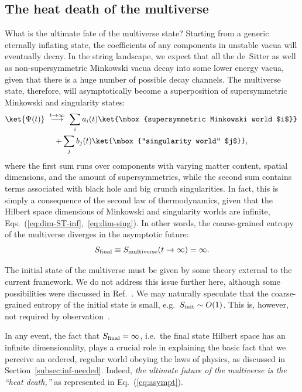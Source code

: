 \documentclass[12pt]{article}
\begin{document}
\subsection{The heat death of the multiverse}
\label{subsec:infinite}

What is the ultimate fate of the multiverse state?  Starting from a generic 
eternally inflating state, the coefficients of any components in unstable 
vacua will eventually decay.  In the string landscape, we expect that all 
the de~Sitter as well as non-supersymmetric Minkowski vacua decay into 
some lower energy vacua, given that there is a huge number of possible 
decay channels.  The multiverse state, therefore, will asymptotically 
become a superposition of supersymmetric Minkowski and singularity states:
%
\begin{multline}
  \ket{\Psi(t)} \,\,\stackrel{t \rightarrow \infty}{\longrightarrow}\,\, 
    \sum_i a_i(t) \ket{\mbox{supersymmetric Minkowski world $i$}}
  \,\\ + \sum_j b_j(t) \ket{\mbox{``singularity world'' $j$}},
\label{eq:asympt}
\end{multline}
%
where the first sum runs over components with varying matter content, 
spatial dimensions, and the amount of supersymmetries, while the second 
sum contains terms associated with black hole and big crunch singularities. 
In fact, this is simply a consequence of the second law of thermodynamics, 
given that the Hilbert space dimensions of Minkowski and singularity 
worlds are infinite, Eqs.~(\ref{eq:dim-ST-inf},~\ref{eq:dim-sing}). 
In other words, the coarse-grained entropy of the multiverse diverges 
in the asymptotic future:
%
\begin{equation}
  S_{\rm final} \equiv S_{\rm multiverse}(t \rightarrow \infty) = \infty.
\label{eq:S-final}
\end{equation}
%

The initial state of the multiverse must be given by some theory external 
to the current framework.  We do not address this issue further here, 
although some possibilities were discussed in Ref.~\cite{Nomura:2011dt}. 
We may naturally speculate that the coarse-grained entropy of the initial 
state is small, e.g.\ $S_{\rm init} \sim O(1)$.  This is, however, not 
required by observation~\cite{Bousso}.

In any event, the fact that $S_{\rm final} = \infty$, i.e.\ the final 
state Hilbert space has an infinite dimensionality, plays a crucial role 
in explaining the basic fact that we perceive an ordered, regular world 
obeying the laws of physics, as discussed in Section~\ref{subsec:inf-needed}. 
Indeed, {\it the ultimate future of the multiverse is the ``heat death,''} 
as represented in Eq.~(\ref{eq:asympt}).
\end{document}
